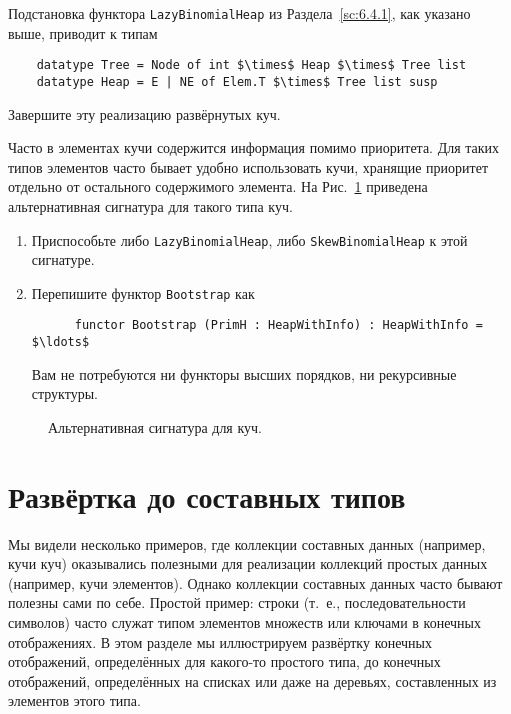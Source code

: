 \begin{exercise}\label{ex:10.7}
  Подстановка функтора \lstinline!LazyBinomialHeap! из
  Раздела~\ref{sc:6.4.1}, как указано выше, приводит к типам
  \begin{lstlisting}
    datatype Tree = Node of int $\times$ Heap $\times$ Tree list
    datatype Heap = E | NE of Elem.T $\times$ Tree list susp
  \end{lstlisting}
  Завершите эту реализацию развёрнутых куч.
\end{exercise}

\begin{exercise}\label{ex:10.8}
  Часто в элементах кучи содержится информация помимо приоритета. Для
  таких типов элементов часто бывает удобно использовать кучи,
  хранящие приоритет отдельно от остального содержимого элемента. На
  Рис.~\ref{fig:10.8} приведена альтернативная сигнатура для такого
  типа куч.
  \begin{enumerate}
  \item Приспособьте либо \lstinline!LazyBinomialHeap!, либо
    \lstinline!SkewBinomialHeap! к этой сигнатуре.
  \item Перепишите функтор \lstinline!Bootstrap! как
    \begin{lstlisting}
      functor Bootstrap (PrimH : HeapWithInfo) : HeapWithInfo = $\ldots$
    \end{lstlisting}
    Вам не потребуются ни функторы высших порядков, ни рекурсивные
    структуры.
  \end{enumerate}
\end{exercise}

\begin{figure}
  \centering
  
  \caption{Альтернативная сигнатура для куч.}
  \label{fig:10.8}
\end{figure}

\section{Развёртка до составных типов}
\label{sc:10.3}

Мы видели несколько примеров, где коллекции составных данных
(например, кучи куч) оказывались полезными для реализации коллекций
простых данных (например, кучи элементов). Однако коллекции составных
данных часто бывают полезны сами по себе.  Простой пример: строки
(т.~е., последовательности символов) часто служат типом
элементов множеств или ключами в конечных отображениях. В этом разделе
мы иллюстрируем развёртку конечных отображений, определённых для
какого-то простого типа, до конечных отображений, определённых на
списках или даже на деревьях, составленных из элементов этого типа.

